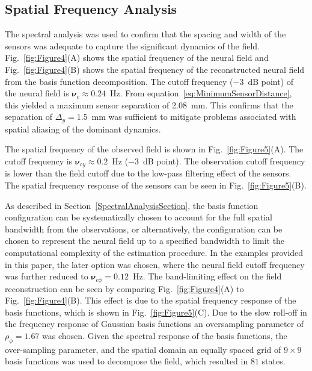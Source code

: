 \documentclass[review,authoryear,3p]{elsarticle}
\begin{document}
\subsection{Spatial Frequency Analysis}
The spectral analysis was used to confirm that the spacing and width of the sensors was adequate to capture the significant dynamics of the field. Fig.~\ref{fig:Figure4}(A) shows the spatial frequency of the neural field and Fig.~\ref{fig:Figure4}(B) shows the spatial frequency of the reconstructed neural field from the basis function decomposition. The cutoff frequency ($-3$~dB point) of the neural field is $\boldsymbol{\nu}_c \approx 0.24$~Hz. From equation~\ref{eq:MinimumSensorDistance}, this yielded a maximum sensor separation of 2.08~mm. This confirms that the separation of $\Delta_{y} = 1.5$~mm was sufficient to mitigate problems associated with spatial aliasing of the dominant dynamics.

The spatial frequency of the observed field is shown in Fig.~\ref{fig:Figure5}(A). The cutoff frequency is $\boldsymbol{\nu}_{cy} \approx 0.2$~Hz ($-3$~dB point). The observation cutoff frequency is lower than the field cutoff due to the low-pass filtering effect of the sensors. The spatial frequency response of the sensors can be seen in Fig.~\ref{fig:Figure5}(B). 

As described in Section~\ref{SpectralAnalysisSection}, the basis function configuration can be systematically chosen to account for the full spatial bandwidth from the observations, or alternatively, the configuration can be chosen to represent the neural field up to a specified bandwidth to limit the computational complexity of the estimation procedure. In the examples provided in this paper, the later option was chosen, where the neural field cutoff frequency was further reduced to $\boldsymbol{\nu}_{c\phi} = 0.12$~Hz. The band-limiting effect on the field reconstruction can be seen by comparing Fig.~\ref{fig:Figure4}(A) to Fig.~\ref{fig:Figure4}(B). This effect is due to the spatial frequency response of the basis functions, which is shown in Fig.~\ref{fig:Figure5}(C). Due to the slow roll-off in the frequency response of Gaussian basis functions an oversampling parameter of $\rho_{\phi} = 1.67$ was chosen. Given the spectral response of the basis functions, the over-sampling parameter, and the spatial domain an equally spaced grid of $9\times9$ basis functions was used to decompose the field, which resulted in $81$ states. 
\end{document}
